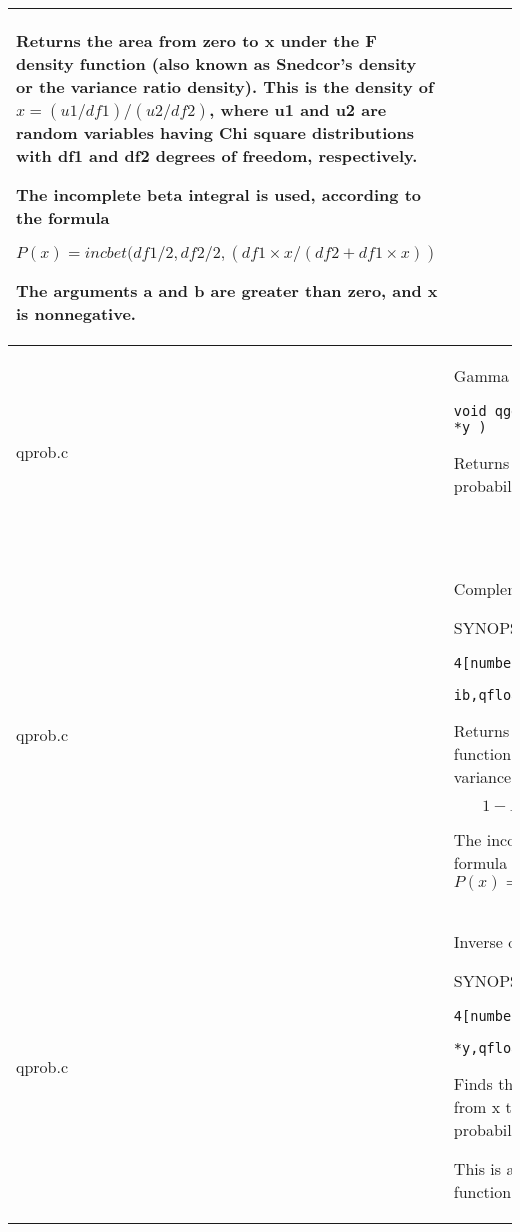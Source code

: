 \documentclass[10pt,a4paper,x11names]{memoir} %
\begin{document}
\begin{longtable}{|p{1.5cm}|p{11.5cm}|}
	
	Returns the area from zero to x under the F density
	function (also known as Snedcor's density or the
	variance ratio density).  This is the density
	of $x = (u1/df1)/(u2/df2)$, where u1 and u2 are random
	variables having Chi square distributions with df1
	and df2 degrees of freedom, respectively.
	
	The incomplete beta integral is used, according to the
	formula
	
	$$P(x) = incbet( df1/2, df2/2, (df1\times x/(df2 + df1\times x) )$$
	
	
	The arguments a and b are greater than zero, and x is
	nonnegative.
	\\\hline
	qprob.c&
	Gamma distribution function 
	
	\texttt{void qgdtr(qfloat *a,qfloat *b,qfloat *x,qfloat *y )}
	
	Returns the integral from zero to x of the gamma probability
	density function:
	$$ y = \frac{a^b}{\Gamma b}\int_{0}^{x}t^{b-1}\ e^{-at}\ dt$$
	\\\hline
	qprob.c&
	Complemented F distribution
	
	{\footnotesize SYNOPSIS:}\vspace{-0.2cm}
	\begin{lstlisting}4[numbers=none]
		void qfdtrc(const int ia,const int ib,qfloat *const x, qfloat *y)
	\end{lstlisting}\vspace{-0.2cm}
	
	Returns the area from x to infinity under the F density
	function (also known as Snedcor's density or the
	variance ratio density).
	$$ 1-P(x)=\frac{1}{B(a,b)} \int_{x}^{\infty}t^{a-1}\ (1-t)^{b-1}\ dt$$
	The incomplete beta integral is used, according to the
	formula
	$$P(x) = incbet( df2/2, df1/2, (df2/(df2 + df1*x) )$$
	\\\hline
	qprob.c&	Inverse of complemented F distribution
	
	{\footnotesize SYNOPSIS:}\vspace{-0.2cm}
	\begin{lstlisting}4[numbers=none]
		void qfdtri(int ia,int ib,qfloat *y,qfloat *x );
	\end{lstlisting}\vspace{-0.2cm}
	
	Finds the F density argument x such that the integral from x to infinity of the F density is equal to the
	given probability p.
	
	This is accomplished using the inverse beta integral function and the relations
	

\end{longtable}
\end{document}
